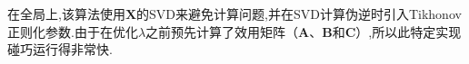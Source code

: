 在全局上,该算法使用$\bm X$的SVD来避免计算问题,并在SVD计算伪逆时引入Tikhonov正则化参数.由于在优化$\lambda$之前预先计算了效用矩阵（$\bm A、\bm B$和$\bm C$）,所以此特定实现碰巧运行得非常快.
